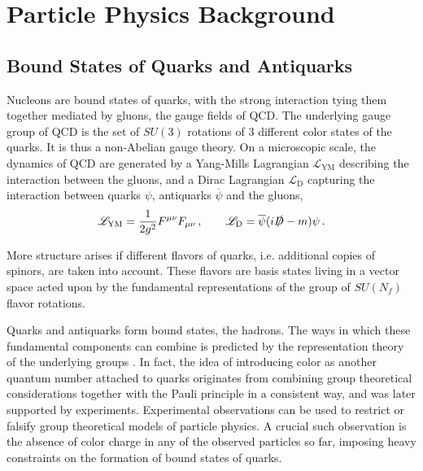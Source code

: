 \chapter{Particle Physics Background}

\section{Bound States of Quarks and Antiquarks}

Nucleons are bound states of quarks, with the strong interaction tying them together mediated by gluons, the gauge fields of QCD. The underlying gauge group of QCD is the set of $SU(3)$ rotations of 3 different color states of the quarks. It is thus a non-Abelian gauge theory. On a microscopic scale, the dynamics of QCD are generated by a Yang-Mills Lagrangian $\mathscr{L}_{\text{YM}}$ describing the interaction between the gluons, and a Dirac Lagrangian $\mathscr{L}_{\text{D}}$ capturing the interaction between quarks $\psi$, antiquarks $\overline{\psi}$ and the gluons,
\begin{equation}
    \begin{gathered}
        \mathscr{L}_{\text{YM}}=\frac{1}{2g^2}F^{\mu\nu}F_{\mu\nu}\,,\qquad\mathscr{L}_{\text{D}}=\overline{\psi}({i}\slashed{D}-m)\psi\,.
    \end{gathered}
    \label{eq:LagrangiansQCD}
\end{equation}

More structure arises if different flavors of quarks, i.e. additional copies of spinors, are taken into account. These flavors are basis states living in a vector space acted upon by the fundamental representations of the group of $SU(N_f)$ flavor rotations. 

Quarks and antiquarks form bound states, the hadrons. The ways in which these fundamental components can combine is predicted by the representation theory of the underlying groups \cite{Floerchinger_2020}. In fact, the idea of introducing color as another quantum number attached to quarks originates from combining group theoretical considerations together with the Pauli principle in a consistent way, and was later supported by experiments. Experimental observations can be used to restrict or falsify group theoretical models of particle physics. A crucial such observation is the absence of color charge in any of the observed particles so far, imposing heavy constraints on the formation of bound states of quarks.

